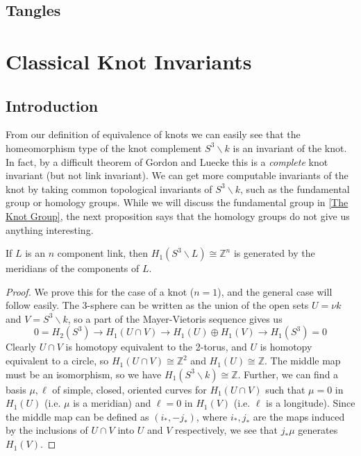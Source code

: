\subsection{Tangles}
\label{Tangles}














\newpage
\section{Classical Knot Invariants}
\label{Classical Knot Invariants}


\subsection{Introduction}
\label{Introduction}


From our definition of equivalence of knots we can easily see that the homeomorphism type of the knot complement $S^3 \backslash k$ is an invariant of the knot. In fact, by a difficult theorem of Gordon and Luecke this is a \emph{complete} knot invariant (but not link invariant). We can get more computable invariants of the knot by taking common topological invariants of $S^3 \backslash k$, such as the fundamental group or homology groups. While we will discuss the fundamental group in \cref{The Knot Group}, the next proposition says that the homology groups do not give us anything interesting.
\begin{prop}
If $L$ is an $n$ component link, then $H_1(S^3 \backslash L) \cong \mathbb Z^n$ is generated by the meridians of the components of $L$.
\end{prop}
\begin{proof}
We prove this for the case of a knot ($n=1$), and the general case will follow easily. The 3-sphere can be written as the union of the open sets $U = \nu k$ and $V = S^3 \backslash k$, so a part of the Mayer-Vietoris sequence gives us
\[ 0 = H_2(S^3) \longrightarrow H_1(U \cap V) \longrightarrow H_1(U) \oplus H_1(V) \longrightarrow H_1(S^3) = 0 \]
Clearly $U \cap V$ is homotopy equivalent to the 2-torus, and $U$ is homotopy equivalent to a circle, so $H_1(U \cap V) \cong \mathbb Z^2$ and $H_1(U) \cong \mathbb Z$. The middle map must be an isomorphism, so we have $H_1(S^3 \backslash k) \cong \mathbb Z$. Further, we can find a basis $\mu,\ell$ of simple, closed, oriented curves for $H_1(U \cap V)$ such that $\mu=0$ in $H_1(U)$ (i.e. $\mu$ is a meridian) and $\ell=0$ in $H_1(V)$ (i.e. $\ell$ is a longitude). Since the middle map can be defined as $(i_*,-j_*)$, where $i_*,j_*$ are the maps induced by the inclusions of $U \cap V$ into $U$ and $V$ respectively, we see that $j_*\mu$ generates $H_1(V)$.
\end{proof}

